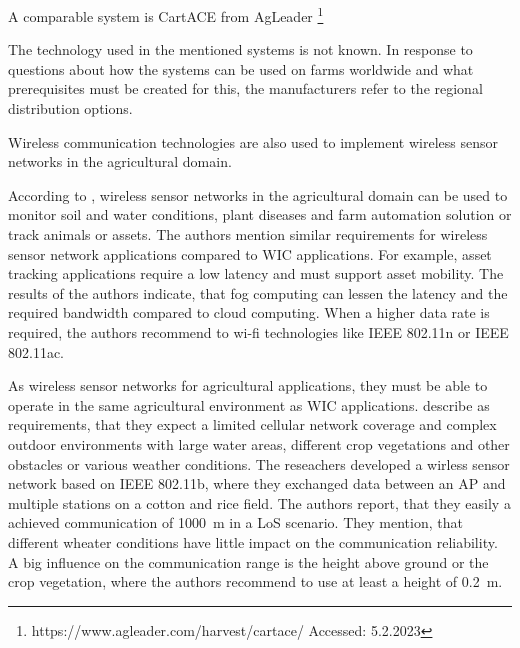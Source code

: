 A comparable system is CartACE from AgLeader \footnote{https://www.agleader.com/harvest/cartace/ Accessed: 5.2.2023}

The technology used in the mentioned systems is not known. In response to questions about how the systems can be used on farms worldwide and what prerequisites must be created for this, the manufacturers refer to the regional distribution options.



Wireless communication technologies are also used to implement wireless sensor networks in the agricultural domain.

According to \textcite{ahmed_internet_2018}, wireless sensor networks in the agricultural domain can be used to monitor soil and water conditions, plant diseases and farm automation solution
or track animals or assets. The authors mention similar requirements for wireless sensor network applications  compared to \ac{WIC} applications.
For example, asset tracking applications require a low latency and must support asset mobility.
The results of the authors indicate, that fog computing can lessen the latency and the required bandwidth compared to cloud computing.
When a higher data rate is required, the authors recommend to wi-fi technologies like IEEE 802.11n or IEEE 802.11ac.

As wireless sensor networks for agricultural applications, they must be able to operate in the same agricultural environment as \ac{WIC} applications.
\textcite{brinkhoff_characterization_2017} describe as requirements, that they expect a limited cellular network coverage and complex outdoor
environments with large water areas, different crop vegetations and other obstacles or various weather conditions. The
reseachers developed a wirless sensor network based on IEEE 802.11b, where they exchanged data between an \ac{AP} and multiple stations on
a cotton and rice field. The authors report, that they easily a achieved communication of \SI{1000}{\metre} in a \ac{LoS} scenario.
They mention, that different wheater conditions have little impact on the communication reliability. A big influence on the communication range is
the height above ground or the crop vegetation, where the authors recommend to use at least a height of \SI{0.2}{\metre}.



